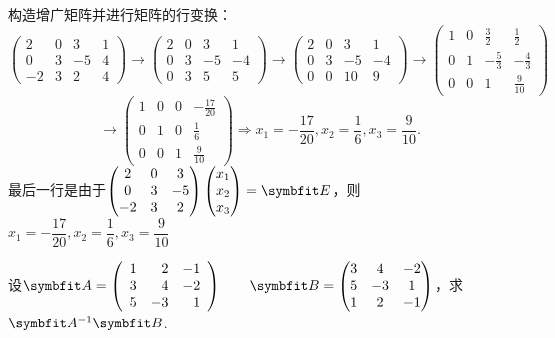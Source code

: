\begin{solution}
    构造增广矩阵并进行矩阵的行变换：\[\left(\begin{array}{cccc}2&0&3&1\\0&3&-5&4\\-2&3&2&4\end{array}\right)\rightarrow \left(\begin{array}{cccc}2&0&3&1\\0&3&-5&-4\\0&3&5&5\end{array}\right)\rightarrow \left(\begin{array}{cccc}2&0&3&1\\0&3&-5&-4\\0&0&10&9\end{array}\right)\rightarrow \begin{pmatrix}1&0&\frac{3}{2}&\frac{1}{2}\\0&1&-\frac{5}{3}&-\frac{4}{3}\\0&0&1&\frac{9}{10}\end{pmatrix}\]\[\rightarrow \begin{pmatrix}1&0&0&-\frac{17}{20}\\0&1&0&\frac{1}{6}\\0&0&1&\frac{9}{10}\end{pmatrix} \Rightarrow x_1=-\dfrac{17}{20},x_2=\dfrac16,x_3=\dfrac{9}{10}.\]
最后一行是由于$\begin{pmatrix}2&0&3\\0&3&-5\\-2&3&2\end{pmatrix}\begin{pmatrix}x_1\\x_2\\x_3\end{pmatrix}=\bv{E}$，则$x_1=-\dfrac{17}{20},x_2=\dfrac16,x_3=\dfrac{9}{10}$
\end{solution}
\begin{example}{}{}
    设$\bv{A}=\left(\begin{array}{rrr}1&2&-1\\3&4&-2\\5&-3&1\end{array}\right)~~~~~~\bv{B}=\begin{pmatrix}3&4&-2\\5&-3&1\\1&2&-1\end{pmatrix}$，求$\bv{A}^{-1}\bv{B}$.
\end{example}
